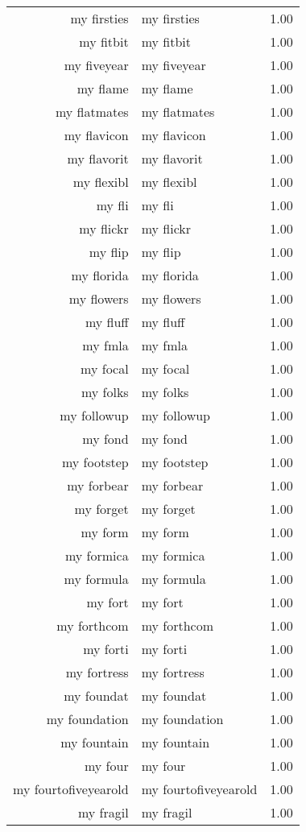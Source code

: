 \begin{table}[ht]
\begin{tabular}{rlr}
  my firsties & my firsties & 1.00 \\ 
  my fitbit & my fitbit & 1.00 \\ 
  my fiveyear & my fiveyear & 1.00 \\ 
  my flame & my flame & 1.00 \\ 
  my flatmates & my flatmates & 1.00 \\ 
  my flavicon & my flavicon & 1.00 \\ 
  my flavorit & my flavorit & 1.00 \\ 
  my flexibl & my flexibl & 1.00 \\ 
  my fli & my fli & 1.00 \\ 
  my flickr & my flickr & 1.00 \\ 
  my flip & my flip & 1.00 \\ 
  my florida & my florida & 1.00 \\ 
  my flowers & my flowers & 1.00 \\ 
  my fluff & my fluff & 1.00 \\ 
  my fmla & my fmla & 1.00 \\ 
  my focal & my focal & 1.00 \\ 
  my folks & my folks & 1.00 \\ 
  my followup & my followup & 1.00 \\ 
  my fond & my fond & 1.00 \\ 
  my footstep & my footstep & 1.00 \\ 
  my forbear & my forbear & 1.00 \\ 
  my forget & my forget & 1.00 \\ 
  my form & my form & 1.00 \\ 
  my formica & my formica & 1.00 \\ 
  my formula & my formula & 1.00 \\ 
  my fort & my fort & 1.00 \\ 
  my forthcom & my forthcom & 1.00 \\ 
  my forti & my forti & 1.00 \\ 
  my fortress & my fortress & 1.00 \\ 
  my foundat & my foundat & 1.00 \\ 
  my foundation & my foundation & 1.00 \\ 
  my fountain & my fountain & 1.00 \\ 
  my four & my four & 1.00 \\ 
  my fourtofiveyearold & my fourtofiveyearold & 1.00 \\ 
  my fragil & my fragil & 1.00 \\ 

\end{tabular}
\end{table}
